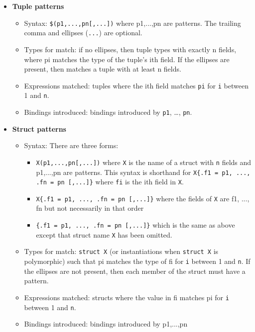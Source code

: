 \begin{itemize}
\item \textbf{Tuple patterns}
  \begin{itemize}
  \item Syntax: \texttt{\$(p1,...,pn[,...])} where p1,...,pn are patterns.
   The trailing comma and ellipses (\texttt{...}) are optional.
  \item Types for match: if no ellipses, then tuple types with exactly
    n fields, where pi matches 
    the type of the tuple's ith field.  If the ellipses are present,
    then matches a tuple with at least n fields.  
  \item Expressions matched: tuples where the ith field matches \texttt{pi} for
    \texttt{i} between 1 and \texttt{n}.
  \item Bindings introduced: bindings introduced by \texttt{p1}, \ldots,
    \texttt{pn}.
  \end{itemize}
  
\item \textbf{Struct patterns}
  \begin{itemize}
  \item Syntax: There are three forms:
    \begin{itemize}
    \item \texttt{X(p1,...,pn[,...])} where \texttt{X} is the name of a struct
      with \texttt{n} fields and p1,...,pn are patterns.  This syntax is
      shorthand for \verb|X{.f1 = p1, ..., .fn = pn [,...]}| 
      where \texttt{fi} is the
      ith field in \texttt{X}\@.
    \item \verb|X{.f1 = p1, ..., .fn = pn [,...]}| 
      where the fields of \texttt{X}
      are f1, ..., fn but not necessarily in that order
    \item \verb|{.f1 = p1, ..., .fn = pn [,...]}| which is the same as above
      except that struct name \texttt{X} has been omitted.
    \end{itemize}
      
  \item Types for match: \texttt{struct X} (or instantiations when
    \texttt{struct X} is polymorphic) such that pi matches the type of
    fi for \texttt{i} between 1 and \texttt{n}.  If the ellipses are not
    present, then each member of the struct must have a pattern.
  \item Expressions matched: structs where the value in fi matches pi
    for \texttt{i} between 1 and \texttt{n}.
  \item Bindings introduced: bindings introduced by p1,...,pn
  \end{itemize}
  

\end{itemize}
